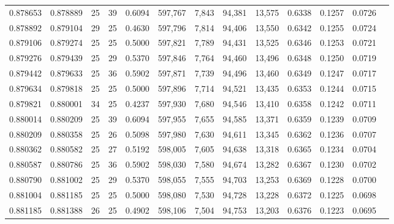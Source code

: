 \begin{tabular}{rrrrrrrrrrrrr}
0.878653 & 0.878889 &    25 &  39 &                                     0.6094 & 597,767 &   7,843 &  94,381 &  13,575 & 0.6338 & 0.1257 & 0.0726 \\
0.878892 & 0.879104 &    29 &  25 &                                     0.4630 & 597,796 &   7,814 &  94,406 &  13,550 & 0.6342 & 0.1255 & 0.0724 \\
0.879106 & 0.879274 &    25 &  25 &                                     0.5000 & 597,821 &   7,789 &  94,431 &  13,525 & 0.6346 & 0.1253 & 0.0721 \\
0.879276 & 0.879439 &    25 &  29 &                                     0.5370 & 597,846 &   7,764 &  94,460 &  13,496 & 0.6348 & 0.1250 & 0.0719 \\
0.879442 & 0.879633 &    25 &  36 &                                     0.5902 & 597,871 &   7,739 &  94,496 &  13,460 & 0.6349 & 0.1247 & 0.0717 \\
0.879634 & 0.879818 &    25 &  25 &                                     0.5000 & 597,896 &   7,714 &  94,521 &  13,435 & 0.6353 & 0.1244 & 0.0715 \\
0.879821 & 0.880001 &    34 &  25 &                                     0.4237 & 597,930 &   7,680 &  94,546 &  13,410 & 0.6358 & 0.1242 & 0.0711 \\
0.880014 & 0.880209 &    25 &  39 &                                     0.6094 & 597,955 &   7,655 &  94,585 &  13,371 & 0.6359 & 0.1239 & 0.0709 \\
0.880209 & 0.880358 &    25 &  26 &                                     0.5098 & 597,980 &   7,630 &  94,611 &  13,345 & 0.6362 & 0.1236 & 0.0707 \\
0.880362 & 0.880582 &    25 &  27 &                                     0.5192 & 598,005 &   7,605 &  94,638 &  13,318 & 0.6365 & 0.1234 & 0.0704 \\
0.880587 & 0.880786 &    25 &  36 &                                     0.5902 & 598,030 &   7,580 &  94,674 &  13,282 & 0.6367 & 0.1230 & 0.0702 \\
0.880790 & 0.881002 &    25 &  29 &                                     0.5370 & 598,055 &   7,555 &  94,703 &  13,253 & 0.6369 & 0.1228 & 0.0700 \\
0.881004 & 0.881185 &    25 &  25 &                                     0.5000 & 598,080 &   7,530 &  94,728 &  13,228 & 0.6372 & 0.1225 & 0.0698 \\
0.881185 & 0.881388 &    26 &  25 &                                     0.4902 & 598,106 &   7,504 &  94,753 &  13,203 & 0.6376 & 0.1223 & 0.0695 \\

\end{tabular}
